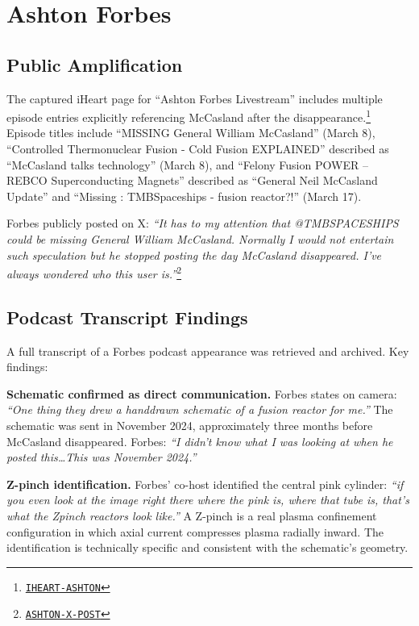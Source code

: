 \documentclass[11pt]{article}
\newcommand{\src}[2]{\href{#1}{\texttt{#2}}}
\begin{document}
\section{Ashton Forbes}

\subsection{Public Amplification}

The captured iHeart page for ``Ashton Forbes Livestream'' includes multiple episode entries explicitly referencing McCasland after the disappearance.\footnote{\src{https://www.iheart.com/podcast/1333-ashton-forbes-livestream-288901968}{IHEART-ASHTON}} Episode titles include ``MISSING General William McCasland'' (March 8), ``Controlled Thermonuclear Fusion - Cold Fusion EXPLAINED'' described as ``McCasland talks technology'' (March 8), and ``Felony Fusion POWER -- REBCO Superconducting Magnets'' described as ``General Neil McCasland Update'' and ``Missing : TMBSpaceships - fusion reactor?!'' (March 17).

Forbes publicly posted on X: \emph{``It has to my attention that @TMBSPACESHIPS could be missing General William McCasland. Normally I would not entertain such speculation but he stopped posting the day McCasland disappeared. I've always wondered who this user is.''}\footnote{\src{https://x.com/AshtonForbes/status/2030070816109441391}{ASHTON-X-POST}}

\subsection{Podcast Transcript Findings}

A full transcript of a Forbes podcast appearance was retrieved and archived. Key findings:

\textbf{Schematic confirmed as direct communication.} Forbes states on camera: \emph{``One thing they drew a handdrawn schematic of a fusion reactor for me.''} The schematic was sent in November 2024, approximately three months before McCasland disappeared. Forbes: \emph{``I didn't know what I was looking at when he posted this\ldots This was November 2024.''}

\textbf{Z-pinch identification.} Forbes' co-host identified the central pink cylinder: \emph{``if you even look at the image right there where the pink is, where that tube is, that's what the Zpinch reactors look like.''} A Z-pinch is a real plasma confinement configuration in which axial current compresses plasma radially inward. The identification is technically specific and consistent with the schematic's geometry.
\end{document}
